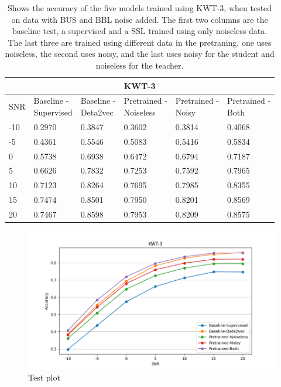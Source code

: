 \begin{table}[H]
    \centering
    \begin{tabular}{@{}llllll@{}}
        \multicolumn{6}{c}{\textbf{KWT-3}}\\
        \toprule
        SNR    & \makecell[l]{ Baseline - \\ Supervised } & \makecell[l]{ Baseline - \\ Deta2vec } & \makecell[l]{ Pretrained - \\ Noiseless } & \makecell[l]{ Pretrained - \\ Noisy } & \makecell[l]{ Pretrained - \\ Both } \\ \midrule
        -10  & 0.2970 & 0.3847 & 0.3602 & 0.3814 & 0.4068 \\
        -5   & 0.4361 & 0.5546 & 0.5083 & 0.5416 & 0.5834 \\
        0    & 0.5738 & 0.6938 & 0.6472 & 0.6794 & 0.7187 \\
        5    & 0.6626 & 0.7832 & 0.7253 & 0.7592 & 0.7965 \\
        10   & 0.7123 & 0.8264 & 0.7695 & 0.7985 & 0.8355 \\
        15   & 0.7474 & 0.8501 & 0.7950 & 0.8201 & 0.8569 \\
        20   & 0.7467 & 0.8598 & 0.7953 & 0.8209 & 0.8575 \\
        
        \bottomrule
    \end{tabular}
    \caption{Shows the accuracy of the five models trained using KWT-3, when tested on data with BUS and BBL noise added. The first two columns are the baseline test, a supervised and a SSL trained using only noiseless data. The last three are trained using different data in the pretraning, one uses noiseless, the second uses noisy, and the last uses noisy for the student and noiseless for the teacher.}
    \label{tab:KWT-3_snrmix_busxbbl}
\end{table}

\begin{figure}[H]
    \centering
    \includegraphics[width=\textwidth]{incl/img/results/kwt3_busxbbl.png}
    \caption{Test plot}
    \label{fig:KWT-3_snrmix_busxbbl}
\end{figure}


